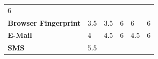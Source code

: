 \begin{longtable}[c]{@{}lllllc@{}}
\begin{minipage}[t]{0.13\columnwidth}\centering\strut
6
\strut\end{minipage}\tabularnewline
\begin{minipage}[t]{0.19\columnwidth}\raggedright\strut
\textbf{Browser Fingerprint}
\strut\end{minipage} &
\begin{minipage}[t]{0.13\columnwidth}\raggedright\strut
3.5
\strut\end{minipage} &
\begin{minipage}[t]{0.13\columnwidth}\raggedright\strut
3.5
\strut\end{minipage} &
\begin{minipage}[t]{0.11\columnwidth}\raggedright\strut
6
\strut\end{minipage} &
\begin{minipage}[t]{0.13\columnwidth}\raggedright\strut
6
\strut\end{minipage} &
\begin{minipage}[t]{0.13\columnwidth}\centering\strut
6
\strut\end{minipage}\tabularnewline
\begin{minipage}[t]{0.19\columnwidth}\raggedright\strut
\textbf{E-Mail}
\strut\end{minipage} &
\begin{minipage}[t]{0.13\columnwidth}\raggedright\strut
4
\strut\end{minipage} &
\begin{minipage}[t]{0.13\columnwidth}\raggedright\strut
4.5
\strut\end{minipage} &
\begin{minipage}[t]{0.11\columnwidth}\raggedright\strut
6
\strut\end{minipage} &
\begin{minipage}[t]{0.13\columnwidth}\raggedright\strut
4.5
\strut\end{minipage} &
\begin{minipage}[t]{0.13\columnwidth}\centering\strut
6
\strut\end{minipage}\tabularnewline
\begin{minipage}[t]{0.19\columnwidth}\raggedright\strut
\textbf{SMS}
\strut\end{minipage} &
\begin{minipage}[t]{0.13\columnwidth}\raggedright\strut
5.5
\strut\end{minipage} &
\begin{minipage}[t]{0.13\columnwidth}\raggedright\strut

\end{minipage}
\end{longtable}
